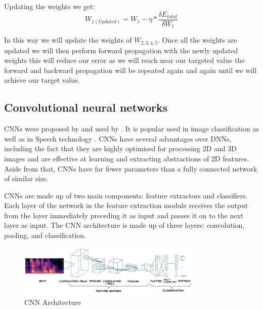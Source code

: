 Updating the weights we get:
\begin{equation}
W_{1(Updated)} = W_{1}-\eta*\frac{\delta E_{total}}{\delta W_{1}}    
\end{equation}

In this way we will update the weights of $W_{2,3,4,5}$. Once all the weights are updated we will then perform forward propagation with the newly updated weights this will reduce our error as we will reach near our targeted value the forward and backward propagation will be repeated again and again until we will achieve our target value.

\subsection{Convolutional neural networks}
\label{sub:CNN}
CNNs were proposed by \cite{fukushima_neocognitron_1988} and used by \cite{lecun_gradient-based_1998}. It is popular used in image classification as well as in Speech technology\cite{abdel-hamid_exploring_2013} \cite{ghahremani_acoustic_2016} \cite{dua_developing_2022}. CNNs have several advantages over DNNs, including the fact that they are highly optimised for processing 2D and 3D images and are effective at learning and extracting abstractions of 2D features. Aside from that, CNNs have far fewer parameters than a fully connected network of similar size.

CNNs are made up of two main components: feature extractors and classifiers. Each layer of the network in the feature extraction module receives the output from the layer immediately preceding it as input and passes it on to the next layer as input. The CNN architecture is made up of three layers: convolution, pooling, and classification.

\begin{figure}[h!]
    \centering
    \includegraphics[width=0.8\textwidth]{img/CNN.jpg}
    \caption{CNN Architecture}
    \label{fig:cnn-arch}
\end{figure}


